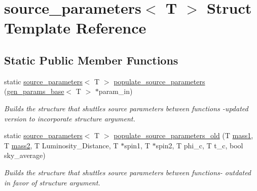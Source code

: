 \hypertarget{structsource__parameters}{}\section{source\+\_\+parameters$<$ T $>$ Struct Template Reference}
\label{structsource__parameters}
\subsection*{Static Public Member Functions}
\begin{DoxyCompactItemize}
\item 
static \hyperlink{structsource__parameters}{source\+\_\+parameters}$<$ T $>$ \hyperlink{structsource__parameters_aa6b0e1aa5122c2887a3db4d40714ac84}{populate\+\_\+source\+\_\+parameters} (\hyperlink{classgen__params__base}{gen\+\_\+params\+\_\+base}$<$ T $>$ $\ast$param\+\_\+in)
\begin{DoxyCompactList}\small\item\em Builds the structure that shuttles source parameters between functions -\/updated version to incorporate structure argument. \end{DoxyCompactList}\item 
static \hyperlink{structsource__parameters}{source\+\_\+parameters}$<$ T $>$ \hyperlink{structsource__parameters_a1b9db2c7d8abf202ca908fd4e58b0949}{populate\+\_\+source\+\_\+parameters\+\_\+old} (T \hyperlink{structsource__parameters_a1a222ddfbc43359da566d085d92e7b72}{mass1}, T \hyperlink{structsource__parameters_a889d5e8ae96cec656504784f19916b5d}{mass2}, T Luminosity\+\_\+\+Distance, T $\ast$spin1, T $\ast$spin2, T phi\+\_\+c, T t\+\_\+c, bool sky\+\_\+average)
\begin{DoxyCompactList}\small\item\em Builds the structure that shuttles source parameters between functions-\/ outdated in favor of structure argument. \end{DoxyCompactList}\end{DoxyCompactItemize}

